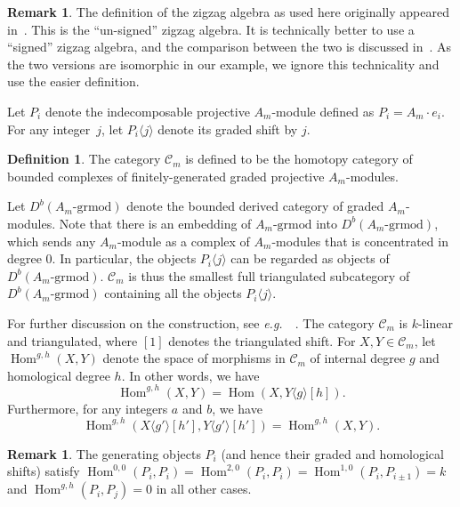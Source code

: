\documentclass{amsart}
\theoremstyle{definition}
\newtheorem{definition}[theorem]{Definition}
\newtheorem{remark}[theorem]{Remark}
\DeclareMathOperator{\Hom}{Hom} %
\newcommand{\eg}{\textit{e.g.}~} %
\begin{document}
\begin{remark}
The definition of the zigzag algebra as used here originally appeared in~\cite[Sect.~3]{hue.kho:01}.
This is the ``un-signed'' zigzag algebra.
It is technically better to use a ``signed'' zigzag algebra, and the comparison between the two is discussed in~\cite[Rem.~6.6]{bap.deo.lic:20}.
As the two versions are isomorphic in our example, we ignore this technicality and use the easier definition.
\end{remark}

Let \(P_i\) denote the indecomposable projective \(A_m\)-module defined as \(P_i = A_m\cdot e_i\).
For any integer~\(j\), let \(P_i \langle j \rangle\) denote its graded shift by \(j\).

\begin{definition}
The category \(\mathcal{C}_m\) is defined to be the homotopy category of bounded complexes of finitely-generated graded projective \(A_m\)-modules.
\end{definition}
Let \(D^b(A_m\text{-grmod})\) denote the bounded derived category of graded \(A_m\)-modules.
Note that there is an embedding of \(A_m\text{-grmod}\) into \(D^b(A_m\text{-grmod})\), which sends any \(A_m\)-module as a complex of \(A_m\)-modules that is concentrated in degree \(0\).
In particular, the objects \(P_i\langle j \rangle\) can be regarded as objects of \(D^b(A_m\text{-grmod})\).
\(\mathcal{C}_m\) is thus the smallest full triangulated subcategory of \(D^b(A_m\text{-grmod})\) containing all the objects \(P_i\langle j \rangle\).

For further discussion on the construction, see \eg~\cite[Sect.~2.3.3]{bap.deo.lic:22}.
The category \(\mathcal{C}_m\) is \(k\)-linear and triangulated, where \([1]\) denotes the triangulated shift.
For \(X, Y \in \mathcal{C}_m\), let \(\Hom^{g,h}(X,Y)\) denote the space of morphisms in \(\mathcal{C}_m\) of internal degree \(g\) and homological degree \(h\).
In other words, we have
\[
\Hom^{g,h}(X,Y) = \Hom(X,Y\langle g \rangle[h]).
\]
Furthermore, for any integers \(a\) and \(b\), we have
\[
\Hom^{g,h}(X\langle g' \rangle[h'], Y\langle g' \rangle[h']) = \Hom^{g,h}(X,Y).
\]

\begin{remark}
\label{rem:generating-morphisms}
The generating objects \(P_i\) (and hence their graded and homological shifts) satisfy \(\Hom^{0,0}(P_i,P_i) = \Hom^{2,0}(P_i,P_i) = \Hom^{1,0}(P_i,P_{i\pm1}) = k\) and \(\Hom^{g,h}(P_i, P_j) = 0\) in all other cases.
\end{remark}
\end{document}

